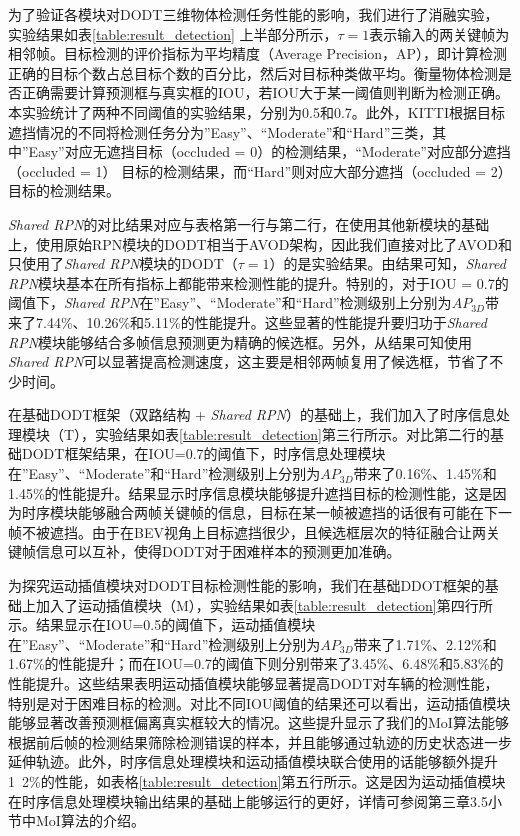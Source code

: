 

为了验证各模块对DODT三维物体检测任务性能的影响，我们进行了消融实验，实验结果如表\ref{table:result_detection} 上半部分所示，$\tau = 1$表示输入的两关键帧为相邻帧。目标检测的评价指标为平均精度（Average Precision，AP），即计算检测正确的目标个数占总目标个数的百分比，然后对目标种类做平均。衡量物体检测是否正确需要计算预测框与真实框的IOU，若IOU大于某一阈值则判断为检测正确。本实验统计了两种不同阈值的实验结果，分别为0.5和0.7。此外，KITTI根据目标遮挡情况的不同将检测任务分为”Easy”、“Moderate”和“Hard”三类，其中”Easy”对应无遮挡目标（occluded = 0）的检测结果，“Moderate”对应部分遮挡（occluded = 1） 目标的检测结果，而“Hard”则对应大部分遮挡（occluded = 2） 目标的检测结果。

\textit{Shared RPN}的对比结果对应与表格第一行与第二行，在使用其他新模块的基础上，使用原始RPN模块的DODT相当于AVOD架构，因此我们直接对比了AVOD和只使用了\textit{Shared RPN}模块的DODT（$\tau = 1$）的是实验结果。由结果可知，\textit{Shared RPN}模块基本在所有指标上都能带来检测性能的提升。特别的，对于IOU = 0.7的阈值下，\textit{Shared RPN}在”Easy”、“Moderate”和“Hard”检测级别上分别为$AP_{3D}$带来了7.44\%、10.26\%和5.11\%的性能提升。这些显著的性能提升要归功于\textit{Shared RPN}模块能够结合多帧信息预测更为精确的候选框。另外，从结果可知使用\textit{Shared RPN}可以显著提高检测速度，这主要是相邻两帧复用了候选框，节省了不少时间。

在基础DODT框架（双路结构 + \textit{Shared RPN}）的基础上，我们加入了时序信息处理模块（T），实验结果如表\ref{table:result_detection}第三行所示。对比第二行的基础DODT框架结果，在IOU=0.7的阈值下，时序信息处理模块在”Easy”、“Moderate”和“Hard”检测级别上分别为$AP_{3D}$带来了0.16\%、1.45\%和1.45\%的性能提升。结果显示时序信息模块能够提升遮挡目标的检测性能，这是因为时序模块能够融合两帧关键帧的信息，目标在某一帧被遮挡的话很有可能在下一帧不被遮挡。由于在BEV视角上目标遮挡很少，且候选框层次的特征融合让两关键帧信息可以互补，使得DODT对于困难样本的预测更加准确。

为探究运动插值模块对DODT目标检测性能的影响，我们在基础DDOT框架的基础上加入了运动插值模块（M），实验结果如表\ref{table:result_detection}第四行所示。结果显示在IOU=0.5的阈值下，运动插值模块在”Easy”、“Moderate”和“Hard”检测级别上分别为$AP_{3D}$带来了1.71\%、2.12\%和1.67\%的性能提升；而在IOU=0.7的阈值下则分别带来了3.45\%、6.48\%和5.83\%的性能提升。这些结果表明运动插值模块能够显著提高DODT对车辆的检测性能，特别是对于困难目标的检测。对比不同IOU阈值的结果还可以看出，运动插值模块能够显著改善预测框偏离真实框较大的情况。这些提升显示了我们的MoI算法能够根据前后帧的检测结果筛除检测错误的样本，并且能够通过轨迹的历史状态进一步延伸轨迹。此外，时序信息处理模块和运动插值模块联合使用的话能够额外提升1~2\%的性能，如表格\ref{table:result_detection}第五行所示。这是因为运动插值模块在时序信息处理模块输出结果的基础上能够运行的更好，详情可参阅第三章3.5小节中MoI算法的介绍。

